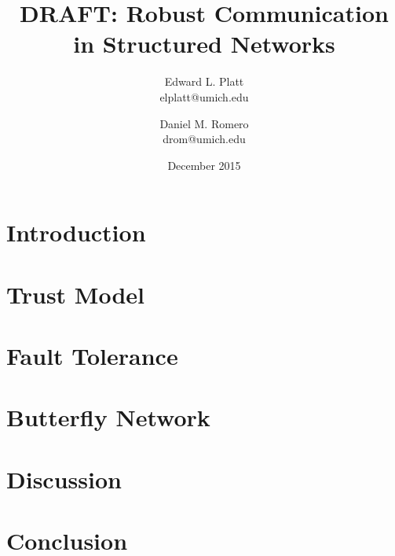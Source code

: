 \documentclass[twocolumn]{article}
\title{DRAFT: Robust Communication in Structured Networks}
\author{
    Edward L. Platt\\
    elplatt@umich.edu
    \and
    Daniel M. Romero\\
    drom@umich.edu
}
\date{December 2015}
\begin{document}
\maketitle

\section{Introduction}

\section{Trust Model}

\section{Fault Tolerance}

\section{Butterfly Network}

\section{Discussion}

\section{Conclusion}



\end{document}
